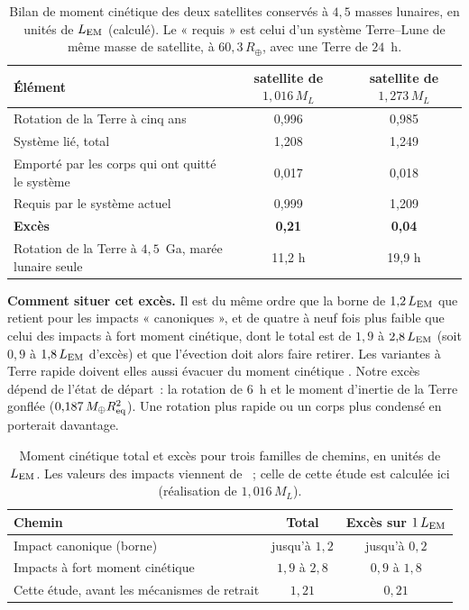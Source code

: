 \documentclass[11pt,a4paper]{article}
\newcommand{\Rt}{\ensuremath{R_\oplus}}
\newcommand{\Mt}{\ensuremath{M_\oplus}}
\newcommand{\ML}{\ensuremath{M_L}}
\newcommand{\LEM}{\ensuremath{L_{\rm EM}}}
\newcommand{\Req}{\ensuremath{R_{\rm eq}}}
\begin{document}
\begin{table}[htbp]
\centering
\caption{Bilan de moment cinétique des deux satellites conservés à $4{,}5$ masses lunaires, en unités de $\LEM$ (calculé). Le « requis » est celui d'un système Terre--Lune de même masse de satellite, à $60{,}3\,\Rt$, avec une Terre de $24$~h.\label{tab:AM45}}
\small
\begin{tabular}{lcc}
\toprule
Élément & satellite de $1{,}016\,\ML$ & satellite de $1{,}273\,\ML$ \\
\midrule
Rotation de la Terre à cinq ans & 0,996 & 0,985 \\
Système lié, total & 1,208 & 1,249 \\
Emporté par les corps qui ont quitté le système & 0,017 & 0,018 \\
Requis par le système actuel & 0,999 & 1,209 \\
\textbf{Excès} & \textbf{0,21} & \textbf{0,04} \\
Rotation de la Terre à $4{,}5$~Ga, marée lunaire seule & 11,2 h & 19,9 h \\
\bottomrule
\end{tabular}
\end{table}

\textbf{Comment situer cet excès.} Il est du même ordre que la borne de $1{,}2\,\LEM$ que \citet{Canup2014} retient pour les impacts « canoniques », et de quatre à neuf fois plus faible que celui des impacts à fort moment cinétique, dont le total est de $1{,}9$ à $2{,}8\,\LEM$ (soit $0{,}9$ à $1{,}8\,\LEM$ d'excès) et que l'évection doit alors faire retirer. Les variantes à Terre rapide doivent elles aussi évacuer du moment cinétique \citep{CukStewart2012,Tremaine2009}. Notre excès dépend de l'état de départ~: la rotation de $6$~h et le moment d'inertie de la Terre gonflée ($0{,}187\,\Mt\Req^2$). Une rotation plus rapide ou un corps plus condensé en porterait davantage.

\begin{table}[htbp]
\centering
\caption{Moment cinétique total et excès pour trois familles de chemins, en unités de $\LEM$. Les valeurs des impacts viennent de \citet{Canup2014}~; celle de cette étude est calculée ici (réalisation de $1{,}016\,\ML$).\label{tab:compAM}}
\small
\begin{tabular}{lcc}
\toprule
Chemin & Total & Excès sur $1\,\LEM$ \\
\midrule
Impact canonique (borne) & jusqu'à $1{,}2$ & jusqu'à $0{,}2$ \\
Impacts à fort moment cinétique & $1{,}9$ à $2{,}8$ & $0{,}9$ à $1{,}8$ \\
Cette étude, avant les mécanismes de retrait & $1{,}21$ & $0{,}21$ \\
\bottomrule
\end{tabular}
\end{table}
\end{document}
